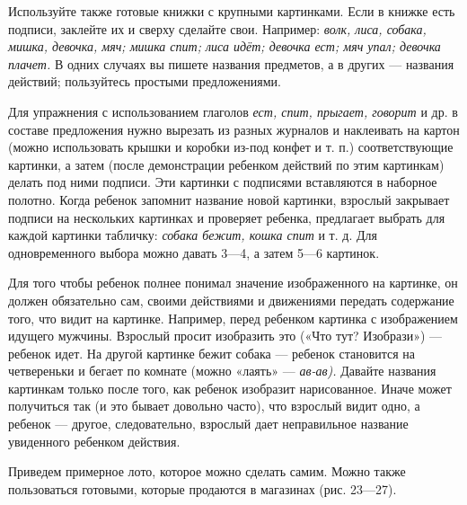 \documentclass[a5paper]{book}
\renewcommand{\emph}[1]{\textit{#1}}
\begin{document}
Используйте также готовые книжки с крупными картинками. Если в книжке
есть подписи, заклейте их и сверху сделайте свои. Например: \emph{волк,
лиса, собака, мишка, девочка, мяч; мишка спит; лиса идёт; девочка ест;
мяч упал; девочка плачет.} В одних случаях вы пишете названия предметов,
а в других --- названия действий; пользуйтесь простыми предложениями.

Для упражнения с использованием глаголов \emph{ест, спит, прыгает,
говорит} и др. в составе предложения нужно вырезать из разных журналов и
наклеивать на картон (можно использовать крышки и коробки из-под конфет
и т. п.) соответствующие картинки, а затем (после демонстрации ребенком
действий по этим картинкам) делать под ними подписи. Эти картинки с
подписями вставляются в наборное полотно. Когда ребенок запомнит
название новой картинки, взрослый закрывает подписи на нескольких
картинках и проверяет ребенка, предлагает выбрать для каждой картинки
табличку: \emph{собака бежит, кошка спит} и т. д. Для одновременного
выбора можно давать 3---4, а затем 5---6 картинок.

Для того чтобы ребенок полнее понимал значение изображенного на
картинке, он должен обязательно сам, своими действиями и движениями
передать содержание того, что видит на картинке. Например, перед
ребенком картинка с изображением идущего мужчины. Взрослый просит
изобразить это («Что тут? Изобрази») --- ребенок идет. На другой
картинке бежит собака --- ребенок становится на четвереньки и бегает по
комнате (можно «лаять» --- \emph{ав-ав).} Давайте названия картинкам
только после того, как ребенок изобразит нарисованное. Иначе может
получиться так (и это бывает довольно часто), что взрослый видит одно, а
ребенок --- другое, следовательно, взрослый дает неправильное название
увиденного ребенком действия.

Приведем примерное лото, которое можно сделать самим. Можно также
пользоваться готовыми, которые продаются в магазинах (рис. 23---27).
\end{document}
